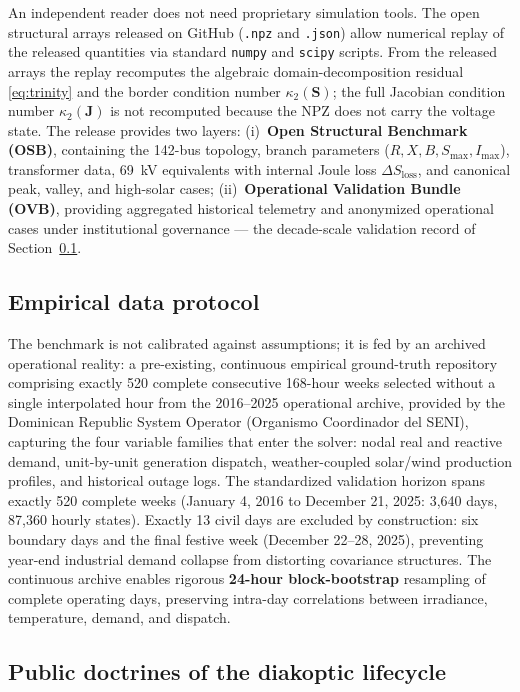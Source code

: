 An independent reader does not need proprietary simulation tools. The open structural arrays released on GitHub (\texttt{.npz} and \texttt{.json}) allow numerical replay of the released quantities via standard \texttt{numpy} and \texttt{scipy} scripts. From the released arrays the replay recomputes the algebraic domain-decomposition residual \eqref{eq:trinity} and the border condition number $\kappa_2(\mathbf{S})$; the full Jacobian condition number $\kappa_2(\mathbf{J})$ is not recomputed because the NPZ does not carry the voltage state. The release provides two layers:
(i)~\textbf{Open Structural Benchmark (OSB)}, containing the 142-bus topology, branch parameters ($R, X, B, S_{\max}, I_{\max}$), transformer data, 69~kV equivalents with internal Joule loss $\Delta S_{\mathrm{loss}}$, and canonical peak, valley, and high-solar cases;
(ii)~\textbf{Operational Validation Bundle (OVB)}, providing aggregated historical telemetry and anonymized operational cases under institutional governance --- the decade-scale validation record of Section~\ref{sub:dataprotocol}.

\subsection{Empirical data protocol}
\label{sub:dataprotocol}

The benchmark is not calibrated against assumptions; it is fed by an archived operational reality: a pre-existing, continuous empirical ground-truth repository comprising exactly 520 complete consecutive 168-hour weeks selected without a single interpolated hour from the 2016--2025 operational archive, provided by the Dominican Republic System Operator (Organismo Coordinador del SENI), capturing the four variable families that enter the solver: nodal real and reactive demand, unit-by-unit generation dispatch, weather-coupled solar/wind production profiles, and historical outage logs. The standardized validation horizon spans exactly 520 complete weeks (January 4, 2016 to December 21, 2025: 3,640 days, 87,360 hourly states). Exactly 13 civil days are excluded by construction: six boundary days and the final festive week (December 22--28, 2025), preventing year-end industrial demand collapse from distorting covariance structures. The continuous archive enables rigorous \textbf{24-hour block-bootstrap} resampling of complete operating days, preserving intra-day correlations between irradiance, temperature, demand, and dispatch.

\subsection{Public doctrines of the diakoptic lifecycle}
\label{sub:doctrines}

